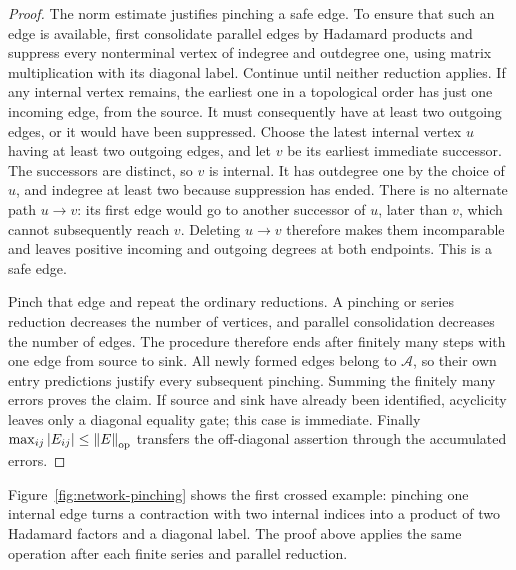\begin{proof}
The norm estimate justifies pinching a safe edge.  To ensure that
such an edge is available, first consolidate parallel edges by
Hadamard products and suppress every nonterminal vertex of indegree
and outdegree one, using matrix multiplication with its diagonal
label.  Continue until neither reduction applies.  If any internal
vertex remains, the earliest one in a topological order has just
one incoming edge, from the source.  It must consequently have
at least two outgoing edges, or it would have been suppressed.
Choose the latest internal vertex $u$ having at least two outgoing
edges, and let $v$ be its earliest immediate successor.  The
successors are distinct, so $v$ is internal.  It has outdegree one
by the choice of $u$, and indegree at least two because suppression
has ended.  There is no alternate path $u\to v$: its first edge
would go to another successor of $u$, later than $v$, which cannot
subsequently reach $v$.  Deleting $u\to v$ therefore makes them
incomparable and leaves positive incoming and outgoing degrees at
both endpoints.  This is a safe edge.

Pinch that edge and repeat the ordinary reductions.  A pinching or
series reduction decreases the number of vertices, and parallel
consolidation decreases the number of edges.  The procedure therefore
ends after finitely many steps with one edge from source to sink.
All newly formed edges belong to $\mathcal A$, so their own entry
predictions justify every subsequent pinching.  Summing the finitely
many errors proves the claim.  If source and sink have already been
identified, acyclicity leaves only a diagonal equality gate; this
case is immediate.  Finally
$\max_{ij}|E_{ij}|\le\left\lVert E\right\rVert_{\mathrm{op}}$ transfers the off-diagonal
assertion through the accumulated errors.
\end{proof}

Figure~\ref{fig:network-pinching} shows the first crossed example:
pinching one internal edge turns a contraction with two internal
indices into a product of two Hadamard factors and a diagonal label.
The proof above applies the same operation after each finite
series and parallel reduction.




